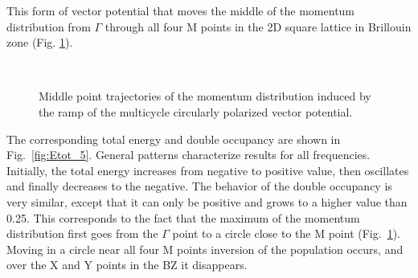 This form of vector potential that moves the middle of the momentum distribution from $\Gamma$ through all four M points in the 2D square lattice in Brillouin zone (Fig. \ref{fig:Pulse_p_5}).
\begin{figure}[h!]
 \\
\caption{Middle point trajectories of the momentum distribution induced by the ramp of the multicycle circularly polarized vector potential.}
\label{fig:Pulse_p_5}
\end{figure}

The corresponding total energy and double occupancy are shown in Fig.~\ref{fig:Etot_5}. General patterns characterize results for all frequencies. Initially, the total energy increases from negative to positive value, then oscillates and finally decreases to the negative. The behavior of the double occupancy is very similar, except that it can only be positive and grows to a higher value than 0.25.
This corresponds to the fact that the maximum of the momentum distribution first goes from the $\Gamma$ point to a circle close to the M point (Fig.~\ref{fig:Pulse_p_5}). Moving in a circle near all four M points inversion of the population occurs, and over the X and Y points in the BZ it disappears. 

\clearpage

